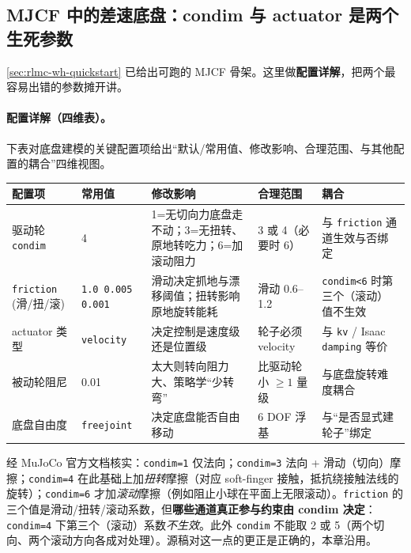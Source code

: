 \subsection{MJCF 中的差速底盘：condim 与 actuator 是两个生死参数}
\label{sec:rlmc-wh-mjcf}

\cref{sec:rlmc-wh-quickstart} 已给出可跑的 MJCF 骨架。这里做\textbf{配置详解}，把两个最容易出错的参数摊开讲。

\paragraph{配置详解（四维表）。}下表对底盘建模的关键配置项给出“默认/常用值、修改影响、合理范围、与其他配置的耦合”四维视图。

\begin{center}
\small
\begin{tabular}{@{}p{2.4cm}p{2.0cm}p{3.4cm}p{2.2cm}p{2.6cm}@{}}
\toprule
配置项 & 常用值 & 修改影响 & 合理范围 & 耦合 \\
\midrule
驱动轮 \verb|condim| & 4 & 1=无切向力底盘走不动；3=无扭转、原地转吃力；6=加滚动阻力 & 3 或 4（必要时 6） & 与 \verb|friction| 通道生效与否绑定 \\
\verb|friction| (滑/扭/滚) & \verb|1.0 0.005 0.001| & 滑动决定抓地与漂移阈值；扭转影响原地旋转能耗 & 滑动 0.6--1.2 & \verb|condim<6| 时第三个（滚动）值不生效 \\
actuator 类型 & \verb|velocity| & 决定控制是速度级还是位置级 & 轮子必须 velocity & 与 \verb|kv| / Isaac \verb|damping| 等价 \\
被动轮阻尼 & 0.01 & 太大则转向阻力大、策略学“少转弯” & 比驱动轮小 $\ge 1$ 量级 & 与底盘旋转难度耦合 \\
底盘自由度 & \verb|freejoint| & 决定底盘能否自由移动 & 6 DOF 浮基 & 与“是否显式建轮子”绑定 \\
\bottomrule
\end{tabular}
\end{center}

\begin{note}[\texttt{condim=4} 是“扭转”不是“滚动”——一个常被抄错的细节]
经 MuJoCo 官方文档核实：\verb|condim=1| 仅法向；\verb|condim=3| 法向 + 滑动（切向）摩擦；\verb|condim=4| 在此基础上加\emph{扭转}摩擦（对应 soft-finger 接触，抵抗绕接触法线的旋转）；\verb|condim=6| 才加\emph{滚动}摩擦（例如阻止小球在平面上无限滚动）。\verb|friction| 的三个值是滑动/扭转/滚动系数，但\textbf{哪些通道真正参与约束由 condim 决定}：\verb|condim=4| 下第三个（滚动）系数\emph{不生效}。此外 \verb|condim| 不能取 2 或 5（两个切向、两个滚动方向各成对处理）。源稿对这一点的更正是正确的，本章沿用。
\end{note}

